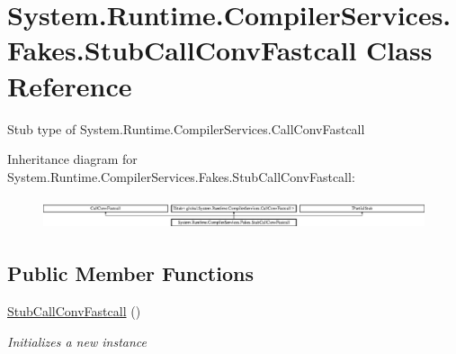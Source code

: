 \hypertarget{class_system_1_1_runtime_1_1_compiler_services_1_1_fakes_1_1_stub_call_conv_fastcall}{\section{System.\-Runtime.\-Compiler\-Services.\-Fakes.\-Stub\-Call\-Conv\-Fastcall Class Reference}
\label{class_system_1_1_runtime_1_1_compiler_services_1_1_fakes_1_1_stub_call_conv_fastcall}
}


Stub type of System.\-Runtime.\-Compiler\-Services.\-Call\-Conv\-Fastcall 


Inheritance diagram for System.\-Runtime.\-Compiler\-Services.\-Fakes.\-Stub\-Call\-Conv\-Fastcall\-:\begin{figure}[H]
\begin{center}
\leavevmode
\includegraphics[height=0.928690cm]{class_system_1_1_runtime_1_1_compiler_services_1_1_fakes_1_1_stub_call_conv_fastcall}
\end{center}
\end{figure}
\subsection*{Public Member Functions}
\begin{DoxyCompactItemize}
\item 
\hyperlink{class_system_1_1_runtime_1_1_compiler_services_1_1_fakes_1_1_stub_call_conv_fastcall_a792b88ff930437a6d367516a65dfe336}{Stub\-Call\-Conv\-Fastcall} ()
\begin{DoxyCompactList}\small\item\em Initializes a new instance\end{DoxyCompactList}\end{DoxyCompactItemize}
